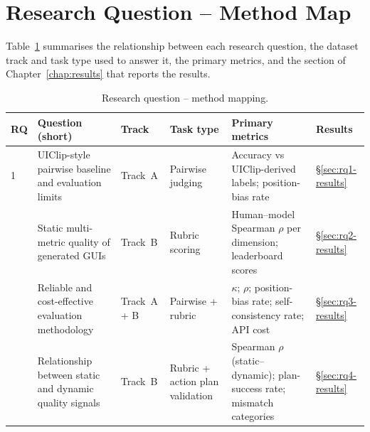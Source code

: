 \section{Research Question -- Method Map}
\label{sec:rq-map}

Table~\ref{tab:rq-map} summarises the relationship between each
research question, the dataset track and task type used to answer it,
the primary metrics, and the section of Chapter~\ref{chap:results}
that reports the results.

\begin{table}[t]
  \centering
  \caption{Research question -- method mapping.}
  \label{tab:rq-map}
  \small
  \setlength{\tabcolsep}{4pt}
  \begin{tabular}{p{0.5cm} p{3.8cm} p{2.2cm} p{2.2cm} p{3.2cm} p{1.2cm}}
    \toprule
    \textbf{RQ} & \textbf{Question (short)} & \textbf{Track} & \textbf{Task type}
      & \textbf{Primary metrics} & \textbf{Results} \\
    \midrule
    1 & UIClip-style pairwise baseline and evaluation limits
      & Track~A & Pairwise judging
      & Accuracy vs UIClip-derived labels; position-bias rate
      & \S\ref{sec:rq1-results} \\
    \addlinespace
    2 & Static multi-metric quality of generated GUIs
      & Track~B & Rubric scoring
      & Human--model Spearman $\rho$ per dimension; leaderboard scores
      & \S\ref{sec:rq2-results} \\
    \addlinespace
    3 & Reliable and cost-effective evaluation methodology
      & Track~A + B & Pairwise + rubric
      & $\kappa$; $\rho$; position-bias rate; self-consistency rate; API cost
      & \S\ref{sec:rq3-results} \\
    \addlinespace
    4 & Relationship between static and dynamic quality signals
      & Track~B & Rubric + action plan validation
      & Spearman $\rho$ (static--dynamic); plan-success rate; mismatch categories
      & \S\ref{sec:rq4-results} \\
    \bottomrule
  \end{tabular}
\end{table}
